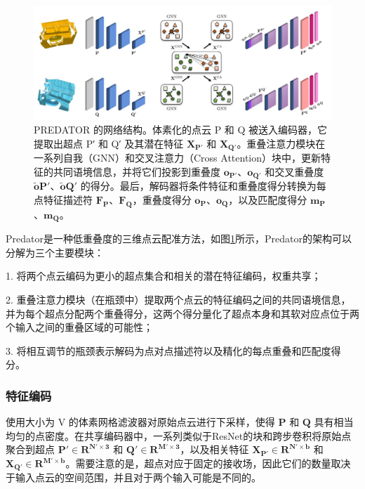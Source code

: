 \begin{figure}
    \vspace{-5mm}
    \centering
    \includegraphics[width=\linewidth]{images/Predator.pdf}
    \caption{
        PREDATOR 的网络结构。体素化的点云 P 和 Q 被送入编码器，它提取出超点 P′ 和 Q′ 及其潜在特征 $\boldsymbol{X_{P'}}$ 和 $\boldsymbol{X_{Q'}}$。重叠注意力模块在一系列自我（GNN）和交叉注意力（Cross Attention）块中，更新特征的共同语境信息，并将它们投影到重叠度 $\boldsymbol{o_{P'}}$、$\boldsymbol{o_{Q'}}$ 和交叉重叠度 $\boldsymbol{\tilde{o}{P'}}$、$\boldsymbol{\tilde{o}{Q'}}$ 的得分。最后，解码器将条件特征和重叠度得分转换为每点特征描述符 $\boldsymbol{F_{P}}$、$\boldsymbol{F_{Q}}$，重叠度得分 $\boldsymbol{o_{P}}$、$\boldsymbol{o_{Q}}$，以及匹配度得分 $\boldsymbol{m_{P}}$、$\boldsymbol{m_{Q}}$。}
    \label{fig:predator}
    \vspace{-5mm}
\end{figure}

Predator\cite{huang2021predator}是一种低重叠度的三维点云配准方法，如图\ref{fig:predator}所示，Predator的架构可以分解为三个主要模块：

1. 将两个点云编码为更小的超点集合和相关的潜在特征编码，权重共享；

2. 重叠注意力模块（在瓶颈中）提取两个点云的特征编码之间的共同语境信息，并为每个超点分配两个重叠得分，这两个得分量化了超点本身和其软对应点位于两个输入之间的重叠区域的可能性；

3. 将相互调节的瓶颈表示解码为点对点描述符以及精化的每点重叠和匹配度得分。

\subsubsection{特征编码}使用大小为 V 的体素网格滤波器对原始点云进行下采样，使得 $\boldsymbol{P}$ 和 $\boldsymbol{Q}$ 具有相当均匀的点密度。在共享编码器中，一系列类似于ResNet的块和跨步卷积将原始点聚合到超点 $\boldsymbol{P' \in R^{N' \times 3}}$ 和 $\boldsymbol{Q' \in R^{M' \times 3}}$，以及相关特征 $\boldsymbol{X_{P'} \in R^{N' \times b}}$ 和 $\boldsymbol{X_{Q'} \in R^{M' \times b}}$。需要注意的是，超点对应于固定的接收场，因此它们的数量取决于输入点云的空间范围，并且对于两个输入可能是不同的。

